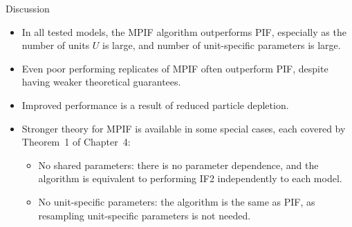 \documentclass[aspectratio=169]{beamer}\usepackage[]{graphicx}\usepackage[]{xcolor}
\begin{document}
\begin{frame}{Discussion}
  \begin{itemize}
    \item In all tested models, the MPIF algorithm outperforms PIF, especially as the number of units $U$ is large, and number of unit-specific parameters is large.
    \item Even poor performing replicates of MPIF often outperform PIF, despite having weaker theoretical guarantees.
    \item Improved performance is a result of reduced particle depletion.
    \item Stronger theory for MPIF is available in some special cases, each covered by Theorem~1 of Chapter~4:
    \begin{itemize}
      \item No shared parameters: there is no parameter dependence, and the algorithm is equivalent to performing IF2 independently to each model. 
      \item No unit-specific parameters: the algorithm is the same as PIF, as resampling unit-specific parameters is not needed.
    \end{itemize}
  \end{itemize}
\end{frame}
\end{document}
